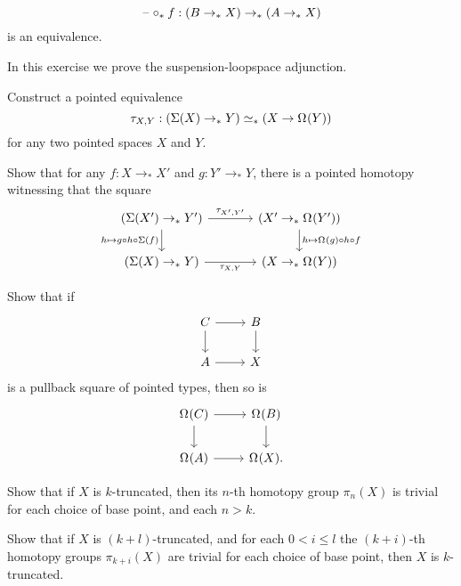 \begin{exercises}
\begin{enumerate}
\begin{equation*}
\mathord{\hspace{1pt}\text{--}\hspace{1pt}}\mathbin{\circ_\ast}f:(B\to_\ast X)\to_\ast (A\to_\ast X)
\end{equation*}
is an equivalence. 
\end{enumerate}
\exercise In this exercise we prove the suspension-loopspace adjunction.
\begin{subexenum}
\item Construct a pointed equivalence
\begin{equation*}
\tau_{X,Y}:(\Sigma(X)\to_\ast Y) \simeq_\ast (X\to \Omega^{}(Y))
\end{equation*}
for any two pointed spaces $X$ and $Y$.
\item Show that for any $f:X\to_\ast X'$ and $g:Y'\to_\ast Y$, there is a pointed homotopy witnessing that the square
\begin{equation*}
\begin{tikzcd}[column sep=large]
(\susp(X')\to_\ast Y') \arrow[r,"\tau_{X',Y'}"] \arrow[d,swap,"h\mapsto g\circ h\circ \susp(f)"] & (X'\to_\ast \loopspace{Y'}) \arrow[d,"h\mapsto\loopspace{g}\circ h\circ f"] \\
(\susp(X)\to_\ast Y) \arrow[r,swap,"\tau_{X,Y}"] & (X\to_\ast \loopspace{Y})
\end{tikzcd}
\end{equation*}
\end{subexenum}
\exercise Show that if
\begin{equation*}
\begin{tikzcd}
C \arrow[r] \arrow[d] & B \arrow[d] \\
A \arrow[r] & X
\end{tikzcd}
\end{equation*}
is a pullback square of pointed types, then so is
\begin{equation*}
\begin{tikzcd}
\loopspace{C} \arrow[r] \arrow[d] & \loopspace{B} \arrow[d] \\
\loopspace{A} \arrow[r] & \loopspace{X}.
\end{tikzcd}
\end{equation*}
\exercise 
\begin{subexenum}
\item Show that if $X$ is $k$-truncated, then its $n$-th homotopy group $\pi_n(X)$ is trivial for each choice of base point, and each $n> k$.
\item Show that if $X$ is $(k+l)$-truncated, and for each $0< i\leq l$ the $(k+i)$-th homotopy groups $\pi_{k+i}(X)$ are trivial for each choice of base point, then $X$ is $k$-truncated.

\end{subexenum}
\end{exercises}
